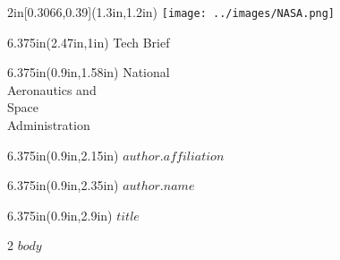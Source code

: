 \documentclass[$if(fontsize)$$fontsize$,$endif$$if(lang)$$lang$,$endif$]{$documentclass$}
\begin{document}
\begin{textblock*}{2in}[0.3066,0.39](1.3in,1.2in)
\texttt{[image: ../images/NASA.png]}
\end{textblock*}

\begin{textblock*}{6.375in}(2.47in,1in)
    \sffamily
	\fontsize{49pt}{0}
	\selectfont
	\setmainfont{Helvetica Light}
	Tech Brief
\end{textblock*}

\begin{textblock*}{6.375in}(0.9in,1.58in)
    \sffamily
	\fontsize{11pt}{0}
	\noindent
	\setmainfont{Helvetica Light}
	\selectfont National\\
    Aeronautics and\\
	Space\\
	Administration
\end{textblock*}

\begin{textblock*}{6.375in}(0.9in,2.15in)
    \sffamily
	\fontsize{14pt}{0}
	\noindent
	\setmainfont{Helvetica75-Bold}
    $author.affiliation$
\end{textblock*}


\begin{textblock*}{6.375in}(0.9in,2.35in)
    \sffamily
	\fontsize{12pt}{0}
	\noindent
	\setmainfont{Helvetica Light}
    $author.name$
\end{textblock*}


\begin{textblock*}{6.375in}(0.9in,2.9in)
	\noindent
	\fontsize{14pt}{0}
	\setmainfont{Helvetica75-Bold}
	$title$
\end{textblock*}

\vspace*{1.8in}

\begin{multicols}{2}
$body$

\end{multicols}
\end{document}

